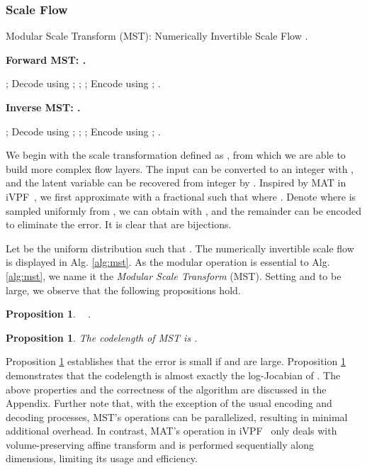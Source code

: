 \documentclass{article}
\newtheorem{proposition}[theorem]{Proposition}
\begin{document}
\subsubsection{Scale Flow}
\label{sec:scale_eleflow}

\begin{algorithm}[h]
\small
\caption{Modular Scale Transform (MST): Numerically Invertible Scale Flow .}
\begin{multicols}{2} 
\textbf{Forward MST: .} 

\begin{algorithmic}[1]
\STATE ;
\STATE Decode  using ; ;
\STATE ;
\STATE Encode  using ;
\RETURN .
\end{algorithmic}

\textbf{Inverse MST: .} 

\begin{algorithmic}[1]
\STATE ;
\STATE Decode  using ; ;
\STATE ;
\STATE Encode  using ;
\RETURN .
\end{algorithmic}
\end{multicols}
\vspace{-8pt}
\label{alg:mst}
\end{algorithm}

We begin with the scale transformation defined as , from which we are able to build more complex flow layers.
The input can be converted to an integer with , and the latent variable  can be recovered from integer  by . Inspired by MAT in iVPF~\cite{zhang2021ivpf}, we first approximate  with a fractional such that  where . Denote  where  is sampled uniformly from , we can obtain  with , and the remainder  can be encoded to eliminate the error. It is clear that  are bijections.

Let  be the uniform distribution such that . The numerically invertible scale flow  is displayed in Alg. \ref{alg:mst}. As the modular operation is essential to Alg. \ref{alg:mst}, we name it the \textit{Modular Scale Transform} (MST). Setting  and  to be large, we observe that the following propositions hold.
\begin{proposition}
\label{the:mst1}
~\cite{zhang2021ivpf} .
\end{proposition}
\begin{proposition}
The codelength of MST is .
\label{the:mst2}
\end{proposition}

Proposition \ref{the:mst1} establishes that the error is small if  and  are large. Proposition \ref{the:mst2} demonstrates that the codelength is almost exactly the log-Jocabian of .
The above properties and the correctness of the algorithm are discussed in the Appendix. 
Further note that, with the exception of the usual encoding and decoding processes, MST's operations can be parallelized, resulting in minimal additional overhead. In contrast, MAT's operation in iVPF~\cite{zhang2021ivpf} only deals with volume-preserving affine transform and is performed sequentially along dimensions, limiting its usage and efficiency.
\end{document}
